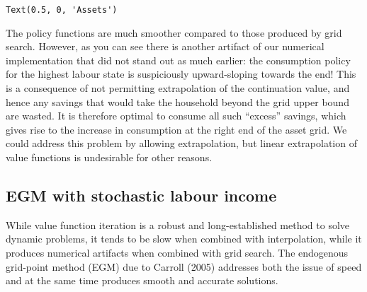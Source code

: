 \documentclass{scrartcl}
\makeatletter
\newcommand{\boxspacing}{\kern\kvtcb@left@rule\kern\kvtcb@boxsep}
\newcommand{\prompt}[4]{
        {\ttfamily\llap{{\color{#2}[#3]:\hspace{3pt}#4}}\vspace{-\baselineskip}}
    }
\makeatother
\begin{document}
            \begin{tcolorbox}[breakable, size=fbox, boxrule=.5pt, pad at break*=1mm, opacityfill=0]
\prompt{Out}{outcolor}{23}{\boxspacing}
\begin{Verbatim}[commandchars=\\\{\}]
Text(0.5, 0, 'Assets')
\end{Verbatim}
\end{tcolorbox}
        
    \begin{center}
    \end{center}
    
    The policy functions are much smoother compared to those produced by
grid search. However, as you can see there is another artifact of our
numerical implementation that did not stand out as much earlier: the
consumption policy for the highest labour state is suspiciously
upward-sloping towards the end! This is a consequence of not permitting
extrapolation of the continuation value, and hence any savings that
would take the household beyond the grid upper bound are wasted. It is
therefore optimal to consume all such ``excess'' savings, which gives
rise to the increase in consumption at the right end of the asset grid.
We could address this problem by allowing extrapolation, but linear
extrapolation of value functions is undesirable for other reasons.


\hypertarget{egm-with-stochastic-labour-income}{%
\subsection{EGM with stochastic labour
income}\label{egm-with-stochastic-labour-income}}

While value function iteration is a robust and long-established method
to solve dynamic problems, it tends to be slow when combined with
interpolation, while it produces numerical artifacts when combined with
grid search. The endogenous grid-point method (EGM) due to Carroll
(2005) addresses both the issue of speed and at the same time produces
smooth and accurate solutions.
\end{document}
